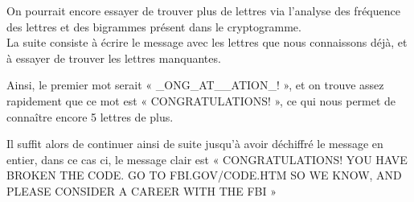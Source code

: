 On pourrait encore essayer de trouver plus de lettres via
l'analyse des fréquence des lettres et des bigrammes présent dans
le cryptogramme.
\\

La suite consiste à écrire le message avec les lettres que nous
connaissons déjà, et à essayer de trouver les lettres manquantes.

Ainsi, le premier mot serait « \_ONG\_AT\_\_ATION\_! », et on trouve
assez rapidement que ce mot est « CONGRATULATIONS! », ce qui nous
permet de connaître encore 5 lettres de plus.

Il suffit alors de continuer ainsi de suite jusqu'à avoir
déchiffré le message en entier, dans ce cas ci, le message clair
est « CONGRATULATIONS! YOU HAVE BROKEN THE CODE. GO TO
FBI.GOV/CODE.HTM SO WE KNOW, AND PLEASE CONSIDER A CAREER WITH THE
FBI »
